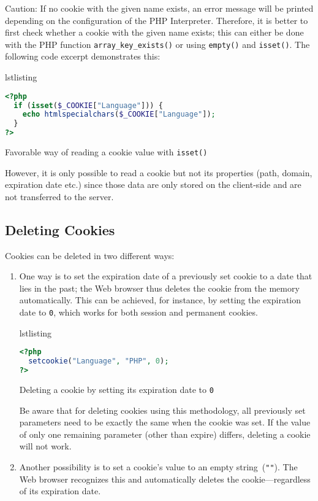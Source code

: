 \documentclass[a4paper, justified, notoc]{tufte-handout} %
\makeatletter
\newenvironment{listing}[1][htbp]
  {\ifvmode\else\unskip\fi\begin{@tufte@float}[#1]{lstlisting}{}}
  {\end{@tufte@float} } %
\makeatother
\begin{document}
Caution: If no cookie with the given name exists, an error message will be printed depending on the configuration of the PHP Interpreter. Therefore, it is better to first check whether a cookie with the given name exists; this can either be done with the PHP function \texttt{array\_key\_exists()} or using \texttt{empty()} and \texttt{isset()}. The following code excerpt demonstrates this:
\begin{listing}
\begin{lstlisting}[language=PHP]
<?php
  if (isset($_COOKIE["Language"])) {
    echo htmlspecialchars($_COOKIE["Language"]);
  }
?>
\end{lstlisting}
	\caption{Favorable way of reading a cookie value with \texttt{isset()}}
	\label{setting_cookies}
\end{listing}

However, it is only possible to read a cookie but not its properties (path, domain, expiration date etc.) since those data are only stored on the client-side and are not transferred to the server. 

\subsection{Deleting Cookies} %
\label{sub:deleting_cookies}

Cookies can be deleted in two different ways:

\begin{enumerate}
	\item One way is to set the expiration date of a previously set cookie to a date that lies in the past; the Web browser thus deletes the cookie from the memory automatically. This can be achieved, for instance, by setting the expiration date to \texttt{0}, which works for both session and permanent cookies.
\begin{listing}
\begin{lstlisting}[language=PHP]
<?php
  setcookie("Language", "PHP", 0);
?>
\end{lstlisting}
	\caption{Deleting a cookie by setting its expiration date to \texttt{0}}
	\label{setting_cookies}
\end{listing}

Be aware that for deleting cookies using this methodology, all previously set parameters need to be exactly the same when the cookie was set. If the value of only one remaining parameter (other than expire) differs, deleting a cookie will not work.

	\item Another possibility is to set a cookie's value to an empty string~(\texttt{""}). The Web browser recognizes this and automatically deletes the cookie---regardless of its expiration date.
\end{enumerate}
\end{document}
